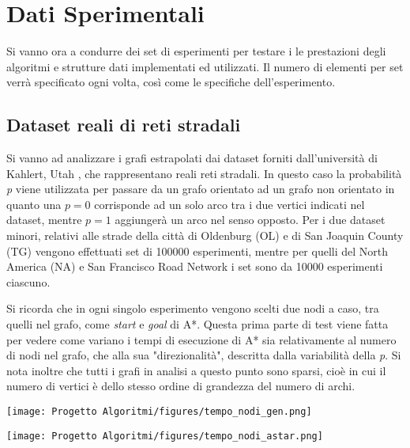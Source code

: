 \documentclass[12pt,a4paper]{report}
\begin{document}
\chapter{Dati Sperimentali}\label{ch:dati-sperim}
Si vanno ora a condurre dei set di esperimenti per testare i le prestazioni degli algoritmi e strutture dati implementati ed utilizzati. 
Il numero di elementi per set verrà specificato ogni volta, così come le specifiche dell'esperimento.

\section{Dataset reali di reti stradali}\label{se:data-strada}
Si vanno ad analizzare i grafi estrapolati dai dataset forniti dall'università di Kahlert, Utah \cite{utahRealDatasets}, che rappresentano reali reti stradali. In questo caso la probabilità \textit{p} viene utilizzata per passare da un grafo orientato ad un grafo non orientato in quanto una $p=0$ corrisponde ad un solo arco tra i due vertici indicati nel dataset, mentre $p=1$ aggiungerà un arco nel senso opposto.
Per i due dataset minori, relativi alle strade della città di Oldenburg (OL) e di San Joaquin County (TG) vengono effettuati set di 100000 esperimenti, mentre per quelli del North America (NA) e San Francisco Road Network i set sono da 10000 esperimenti ciascuno.

Si ricorda che in ogni singolo esperimento vengono scelti due nodi a caso, tra quelli nel grafo, come \textit{start} e \textit{goal} di A*.
Questa prima parte di test viene fatta per vedere come variano i tempi di esecuzione di A* sia relativamente al numero di nodi nel grafo, che alla sua "direzionalità", descritta dalla variabilità della \textit{p}.
Si nota inoltre che tutti i grafi in analisi a questo punto sono sparsi, cioè in cui il numero di vertici è dello stesso ordine di grandezza del numero di archi.

\medskip

\texttt{[image: Progetto Algoritmi/figures/tempo\_nodi\_gen.png]}

\medskip

\texttt{[image: Progetto Algoritmi/figures/tempo\_nodi\_astar.png]}\label{img:tempo-nodi-astar}
\end{document}
